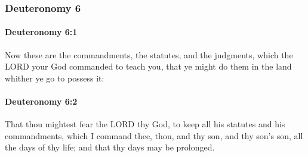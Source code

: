 	\subsubsection{Deuteronomy 6} %
		\label{DEUTERONOMY-6}

		\paragraph{Deuteronomy 6:1} %
			\label{DEUTERONOMY-6-1}

			Now these are the commandments, the statutes, and the judgments, which the LORD your God commanded to teach you, that ye might do them in the land whither ye go to possess it:


		\paragraph{Deuteronomy 6:2} %
			\label{DEUTERONOMY-6-2}

			That thou mightest fear the LORD thy God, to keep all his statutes and his commandments, which I command thee, thou, and thy son, and thy son's son, all the days of thy life; and that thy days may be prolonged.

